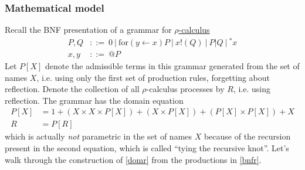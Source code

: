 \documentclass[12pt]{article}
\numberwithin{equation}{section}
\begin{document}
\subsubsection{Mathematical model}
Recall the BNF presentation of a grammar for \href{https://blog.rchain.coop/calculus-primer-\%cf\%81-calculus/}{$\rho$-calculus}
\begin{equation} \label{bnfr}
\begin{split}
P,Q &::= \ 0 \ | \ \text{for}(y \leftarrow x)P \ | \ x!(Q) \ | \ P|Q \ | \ {}^*x \\
x,y &::= \ @P
\end{split}
\end{equation}
Let $P[X]$ denote the admissible terms in this grammar generated from the set of names $X$, i.e. using only the first set of production rules, forgetting about reflection. Denote the collection of all $\rho$-calculus processes by $R$, i.e. using reflection. The grammar has the domain equation
\begin{equation} \label{domr}
\begin{split}
P[X] &= 1 + (X \times X \times P[X]) + (X \times P[X]) + (P[X] \times P[X]) + X \\
R &= P[R]
\end{split}
\end{equation}
which is actually \emph{not} parametric in the set of names $X$ because of the recursion present in the second equation, which is called ``tying the recursive knot''. Let's walk through the construction of \eqref{domr} from the productions in \eqref{bnfr}.
\end{document}
